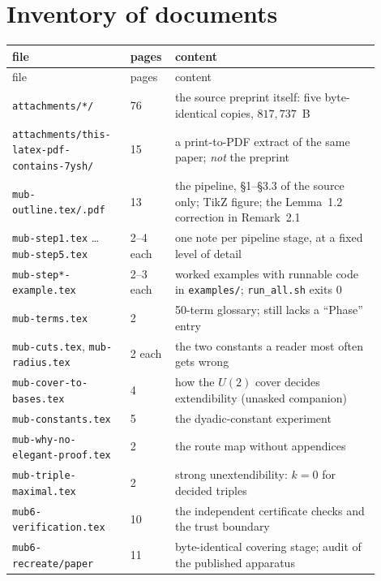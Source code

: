 \documentclass[10pt]{article}
\theoremstyle{definition}
\newcommand{\file}[1]{\texttt{\small #1}}
\begin{document}
\section{Inventory of documents}

\begin{center}
\small
\begin{longtable}{@{}L{0.30\linewidth}L{0.08\linewidth}L{0.52\linewidth}@{}}
\toprule
file & pages & content \\
\midrule
\endfirsthead
\toprule
file & pages & content \\
\midrule
\endhead
\file{attachments/*/} & 76 & the source preprint itself: five byte-identical copies, $817{,}737$~B \\
\file{attachments/this-latex-pdf-contains-7ysh/} & 15 & a print-to-PDF extract of the same paper; \emph{not} the preprint \\
\file{mub-\allowbreak{}outline.tex/\allowbreak{}.pdf} & 13 & the pipeline, \S1--\S3.3 of the source only; TikZ figure; the
Lemma~1.2 correction in Remark~2.1 \\
\file{mub-\allowbreak{}step1.tex} \dots \file{mub-\allowbreak{}step5.tex} & 2--4 each & one note per pipeline stage, at a fixed level
of detail \\
\file{mub-\allowbreak{}step*-\allowbreak{}example.tex} & 2--3 each & worked examples with runnable code in \file{examples/\allowbreak{}};
\file{run\_all.sh} exits $0$ \\
\file{mub-\allowbreak{}terms.tex} & 2 & 50-term glossary; still lacks a ``Phase'' entry \\
\file{mub-\allowbreak{}cuts.tex}, \file{mub-\allowbreak{}radius.tex} & 2 each & the two constants a reader most often gets wrong \\
\file{mub-\allowbreak{}cover-\allowbreak{}to-\allowbreak{}bases.tex} & 4 & how the $U(2)$ cover decides extendibility (unasked companion) \\
\file{mub-\allowbreak{}constants.tex} & 5 & the dyadic-constant experiment \\
\file{mub-\allowbreak{}why-\allowbreak{}no-\allowbreak{}elegant-\allowbreak{}proof.tex} & 2 & the route map without appendices \\
\file{mub-\allowbreak{}triple-\allowbreak{}maximal.tex} & 2 & strong unextendibility: $k=0$ for decided triples \\
\file{mub6-\allowbreak{}verification.tex} & 10 & the independent certificate checks and the trust boundary \\
\file{mub6-\allowbreak{}recreate/\allowbreak{}paper} & 11 & byte-identical covering stage; audit of the published apparatus \\

\end{longtable}
\end{center}
\end{document}

